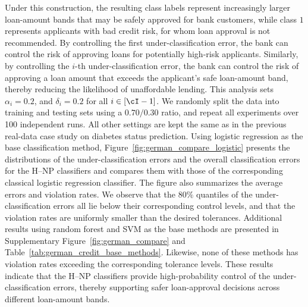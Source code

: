 Under this construction, the resulting class labels represent increasingly larger loan-amount bands that may be safely approved for bank customers, while class 
$1$ represents applicants with bad credit risk, for whom loan approval is not recommended.  By controlling the first under-classification error, the bank can control the risk of approving loans for potentially high-risk applicants. Similarly, by controlling the 
$i$-th under-classification error, the bank can control the risk of approving a loan amount that exceeds the applicant’s safe loan-amount band, thereby reducing the likelihood of unaffordable lending. This analysis sets \(\alpha_i =  0.2\), and \(\delta_i = 0.2\) for all $i \in [\cI - 1]$.  We randomly split the data into training and testing sets using a \(0.70/0.30\) ratio, and repeat all experiments over 100 independent runs. All other settings are kept the same as in the previous real-data case study on diabetes status prediction. Using logistic regression as the base classification method, Figure~\ref{fig:german_compare_logistic} presents the distributions of the under-classification errors and the overall classification errors for the H--NP classifiers and compares them with those of the corresponding classical logistic regression classifier. The figure also summarizes the average errors and violation rates. We observe that the \(80\%\) quantiles of the under-classification errors all lie below their corresponding control levels, and that the violation rates are uniformly smaller than the desired tolerances. Additional results using random forest and SVM as the base methods are presented in Supplementary Figure~\ref{fig:german_compare} and Table~\ref{tab:german_credit_base_methods}. Likewise, none of these methods has violation rates exceeding the corresponding tolerance levels. These results indicate that the H--NP classifiers provide high-probability control of the under-classification errors, thereby supporting safer loan-approval decisions across different loan-amount bands.


 
 







